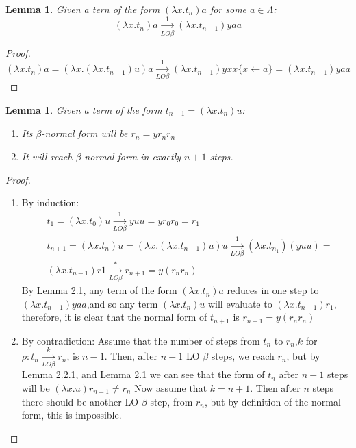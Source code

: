 \documentclass[12pt]{article}
\newtheorem{lemma}[theorem]{Lemma}
\begin{document}
\begin{lemma}\label{lemma1}
  Given a tern of the form $(\lambda x .t_n)a$ for some $a \in \Lambda$:
  \begin{equation}
    (\lambda x .t_n)a \xrightarrow[LO \beta]{1} (\lambda x.t_{n-1})yaa
  \end{equation}
\end{lemma}
\begin{proof}
  \begin{equation}
    (\lambda x . t_n)a = (\lambda x .(\lambda x .t_{n-1})u)a \xrightarrow[LO \beta]{1} (\lambda x . t_{n-1})yxx \{ x \leftarrow a \} = (\lambda x .t_{n-1})yaa
  \end{equation}
\end{proof}
\begin{lemma}
  Given a term of the form $t_{n+1} = (\lambda x. t_n)u$:
  \begin{enumerate}
    \item Its $\beta$-normal form will be $r_n = yr_{n}r_{n}$
    \item It will reach $\beta$-normal form in exactly $n+1$ steps.
  \end{enumerate}
\end{lemma}
\begin{proof}
  \begin{enumerate}
    \item By induction:
          \begin{equation}
            \begin{split}
              & t_1 = (\lambda x .t_0)u \xrightarrow[LO\beta]{1} yuu = yr_0r_0 = r_1 \\
              & t_{n+1} = (\lambda x .t_n) u = (\lambda x. (\lambda x . t_{n-1})u)u \xrightarrow[LO\beta]{1} (\lambda x .t_{n_1})(yuu) = \\
              & (\lambda x. t_{n -1})r1 \xrightarrow[LO\beta]{*}r_{n+1} = y(r_{n}r_{n})
            \end{split}
          \end{equation}
          By Lemma 2.1, any term of the form $(\lambda x. t_n)a$ reduces in one step to $(\lambda  x .t_{n-1})yaa$,and so any term $(\lambda x.t_n)u$ will evaluate to $(\lambda x .t_{n-1})r_1$, therefore, it is clear that the normal form of $t_{n+1}$ is $r_{n+1} = y(r_n r_n)$
    \item By contradiction:
          Assume that the number of steps from $t_n$ to $r_n$,$k$ for $\rho  : t_n \xrightarrow[LO\beta]{k} r_n$, is $n-1$. Then, after $n-1$ LO $\beta$ steps, we reach $r_n$, but by Lemma 2.2.1, and Lemma 2.1 we can see that the form of $t_n$ after $n-1$ steps will be $(\lambda x . u)r_{n-1} \neq r_n$
          Now assume that $k = n+1$. Then after $n$ steps there should be another LO $\beta$ step, from $r_n$, but by definition of the normal form, this is impossible.

  \end{enumerate}
\end{proof}
\end{document}
